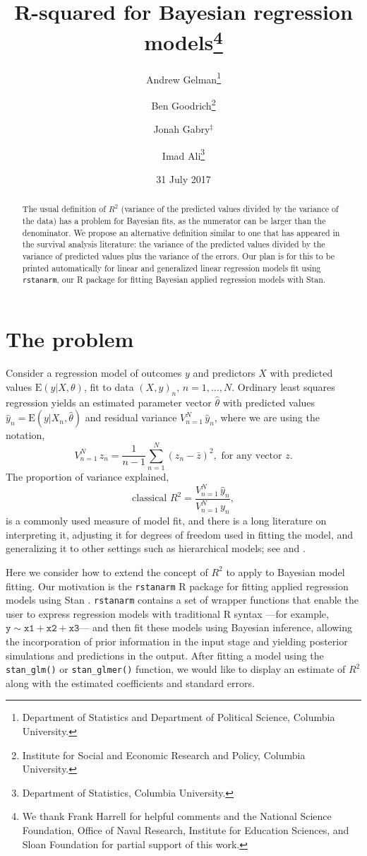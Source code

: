 \documentclass[11pt]{article}
\title{\bf R-squared for Bayesian regression models\footnote{
  We thank Frank Harrell for helpful comments and the National Science Foundation,
  Office of Naval Research, Institute for Education Sciences, and Sloan Foundation
  for partial support of this work.
}\vspace{.1in}}
\author{Andrew Gelman\footnote{Department of Statistics and Department of Political Science, Columbia University.}
  \and Ben Goodrich\footnote{Institute for Social and Economic Research and Policy, Columbia University.}
  \and Jonah Gabry$^\ddagger$
  \and Imad Ali\footnote{Department of Statistics, Columbia University.
}\vspace{.1in}}
\date{31 July 2017\vspace{-.1in}}
\begin{document}
\sloppy
\maketitle
\thispagestyle{empty}

\begin{abstract}
The usual definition of $R^2$ (variance of the predicted values divided by the
variance of the data) has a problem for Bayesian fits, as the numerator can be
larger than the denominator.  We propose an alternative definition similar to
one that has appeared in the survival analysis literature:  the variance of the
predicted values divided by the variance of predicted values plus the variance 
of the errors. Our plan is for this to be printed automatically for linear and
generalized linear regression models fit using {\tt rstanarm}, our R package
for fitting Bayesian applied regression models with Stan.
\end{abstract}

\section{The problem}

Consider a regression model of outcomes $y$ and predictors $X$ with predicted
values $\mbox{E}(y|X,\theta)$, fit to data $(X,y)_n, \, n=1,\ldots,N$.  Ordinary
least squares regression yields an estimated parameter vector $\hat{\theta}$
with predicted values $\hat{y}_n = \mbox{E}(y | X_n, \hat{\theta})$ and residual
variance $V_{n=1}^N \,\hat{y}_n$, where we are using the notation,
%
$$
V_{n=1}^N \, z_n = \frac{1}{n-1}\sum_{n=1}^N (z_n - \bar{z})^2, \mbox{ for any vector }z.
$$
%
The proportion of variance explained,
%
\begin{equation}\label{rsq1}
\mbox{classical } R^2 = \frac{V_{n=1}^N \,\hat{y}_n}{V_{n=1}^N \,y_n},
\end{equation}
%
is a commonly used measure of model fit, and there is a long literature on
interpreting it, adjusting it for degrees of freedom used in fitting the model,
and generalizing it to other settings such as hierarchical models; see \cite{Xu2003}
and \cite{GelmanPardoe2006}.

Here we consider how to extend the concept of $R^2$ to apply to Bayesian model
fitting.  Our motivation is the {\tt rstanarm} R package
\citep{rstanarmRpackage} for fitting applied regression models using Stan
\citep{stan}. {\tt rstanarm} contains a set of wrapper functions that enable the
user to express regression models with traditional R syntax \citep{rcore}
---for example, $\mathtt{y \sim x1 + x2 + x3}$---
and then fit these models using Bayesian inference, allowing the incorporation
of prior information in the input stage and yielding posterior simulations and
predictions in the output.  After fitting a model using the \verb#stan_glm()#
or \verb#stan_glmer()# function, we would like to display an estimate of $R^2$
along with the estimated coefficients and standard errors.
\end{document}
